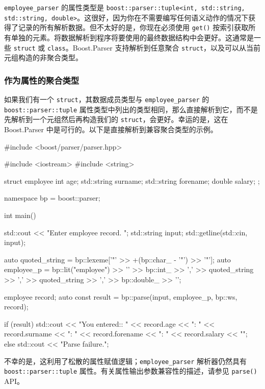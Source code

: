 \texttt{employee\_parser} 的属性类型是 \texttt{boost::parser::tuple<int, std::string, std::string, double>}。这很好，因为你在不需要编写任何语义动作的情况下获得了记录的所有解析数据。但不太好的是，你现在必须使用 \texttt{get()} 按索引获取所有单独的元素。将数据解析到程序将要使用的最终数据结构中会更好。这通常是一些 \texttt{struct} 或 \texttt{class}。Boost.Parser 支持解析到任意聚合 \texttt{struct}，以及可以从当前元组构造的非聚合类型。

\subsubsection{作为属性的聚合类型}

如果我们有一个 \texttt{struct}，其数据成员类型与 \texttt{employee\_parser} 的 \texttt{boost::parser::tuple} 属性类型中列出的类型相同，那么直接解析到它，而不是先解析到一个元组然后再构造我们的 \texttt{struct}，会更好。幸运的是，这在 Boost.Parser 中是可行的。以下是直接解析到兼容聚合类型的示例。

\begin{code}
#include <boost/parser/parser.hpp>

#include <iostream>
#include <string>


struct employee
{
    int age;
    std::string surname;
    std::string forename;
    double salary;
};

namespace bp = boost::parser;

int main()
{
    std::cout << "Enter employee record. ";
    std::string input;
    std::getline(std::cin, input);

    auto quoted_string = bp::lexeme['"' >> +(bp::char_ - '"') >> '"'];
    auto employee_p = bp::lit("employee")
        >> '{'
        >> bp::int_ >> ','
        >> quoted_string >> ','
        >> quoted_string >> ','
        >> bp::double_
        >> '}';

    employee record;
    auto const result = bp::parse(input, employee_p, bp::ws, record);

    if (result) {
        std::cout << "You entered:\nage:      " << record.age
                  << "\nsurname:  " << record.surname
                  << "\nforename: " << record.forename
                  << "\nsalary  : " << record.salary << "\n";
    } else {
        std::cout << "Parse failure.\n";
    }
}
\end{code}

不幸的是，这利用了松散的属性赋值逻辑；\texttt{employee\_parser} 解析器仍然具有 \texttt{boost::parser::tuple} 属性。有关属性输出参数兼容性的描述，请参见 \texttt{parse()} API。


